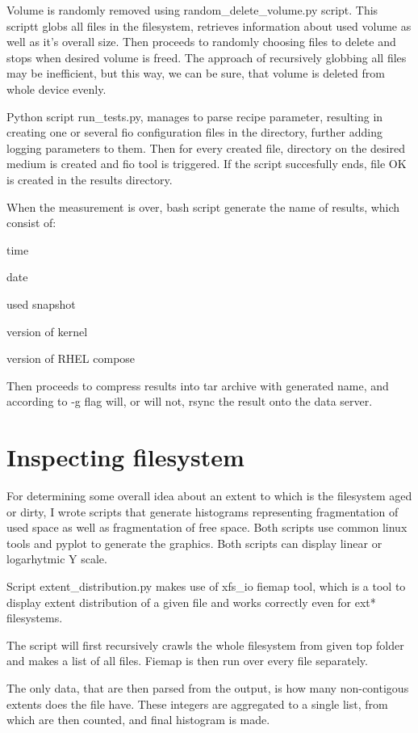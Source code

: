 \documentclass[
  color, %
  table, %
  lof,   %
  lot,   %
]{fithesis3}
\begin{document}
Volume is randomly removed using random\_delete\_volume.py script. This scriptt globs all files in the filesystem, retrieves information about used volume as well as it's overall size. Then proceeds to randomly choosing files to delete and stops when desired volume is freed. The approach of recursively globbing all files may be inefficient, but this way, we can be sure, that volume is deleted from whole device evenly.

Python script run\_tests.py, manages to parse recipe parameter, resulting in creating one or several fio configuration files in the directory, further adding logging parameters to them. Then for every created file, directory on the desired medium is created and fio tool is triggered. If the script succesfully ends, file OK is created in the results directory.

When the measurement is over, bash script generate the name of results, which consist of:
\begin{compactenum}
  \item time
  \item date
  \item used snapshot
  \item version of kernel
  \item version of RHEL compose
\end{compactenum}

Then proceeds to compress results into tar archive with generated name, and according to -g flag will, or will not, rsync the result onto the data server.
\section{Inspecting filesystem}
For determining some overall idea about an extent to which is the filesystem aged or dirty, I wrote scripts that generate histograms representing fragmentation of used space as well as fragmentation of free space. Both scripts use common linux tools and pyplot to generate the graphics. Both scripts can display linear or logarhytmic Y scale.


Script extent\_distribution.py makes use of xfs\_io fiemap tool, which is a tool to display extent distribution of a given file and works correctly even for ext* filesystems.

The script will first recursively crawls the whole filesystem from given top folder and makes a list of all files. Fiemap is then run over every file separately. 

The only data, that are then parsed from the output, is how many non-contigous extents does the file have. These integers are aggregated to a single list, from which are then counted, and final histogram is made.
\end{document}
